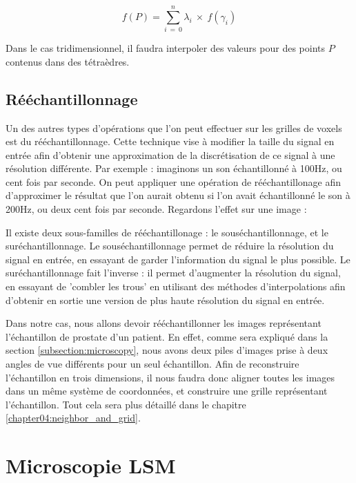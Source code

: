 {{{{{					$$f(P) = \sum_{i~=~0}^{n} \lambda_i~\times~f(\gamma_i)$$

					Dans le cas tridimensionnel, il faudra interpoler des valeurs pour des points $P$ contenus dans des tétraèdres.
				}
			}
			\subsection{Rééchantillonnage}
			{
				Un des autres types d'opérations que l'on peut effectuer sur les grilles de voxels est du rééchantillonnage. Cette technique vise à modifier la taille du signal en entrée afin d'obtenir une approximation de la discrétisation de ce signal à une résolution différente. Par exemple : imaginons un son échantillonné à 100Hz, ou cent fois par seconde. On peut appliquer une opération de rééchantillonage afin d'approximer le résultat que l'on aurait obtenu si l'on avait échantillonné le son à 200Hz, ou deux cent fois par seconde. Regardons l'effet sur une image :\\\par

				Il existe deux sous-familles de rééchantillonage : le souséchantillonnage, et le suréchantillonnage. Le souséchantillonnage permet de réduire la résolution du signal en entrée, en essayant de garder l'information du signal le plus possible. Le suréchantillonnage fait l'inverse : il permet d'augmenter la résolution du signal, en essayant de 'combler les trous' en utilisant des méthodes d'interpolations afin d'obtenir en sortie une version de plus haute résolution du signal en entrée.\par

				Dans notre cas, nous allons devoir rééchantillonner les images représentant l'échantillon de prostate d'un patient. En effet, comme sera expliqué dans la section \ref{subsection:microscopy}, nous avons deux piles d'images prise à deux angles de vue différents pour un seul échantillon. Afin de reconstruire l'échantillon en trois dimensions, il nous faudra donc aligner toutes les images dans un même système de coordonnées, et construire une grille représentant l'échantillon. Tout cela sera plus détaillé dans le chapitre \autoref{chapter04:neighbor_and_grid}.
			}
		}
	}

	\section{Microscopie LSM}
	{
		\par

}}
